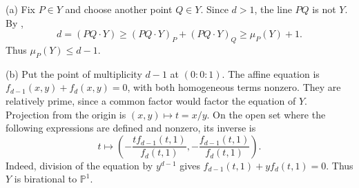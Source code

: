 (a) Fix $P\in Y$ and choose another point $Q\in Y$. Since $d>1$, the line $PQ$ is not $Y$. By ,
\[d=(PQ\cdot Y)\geq(PQ\cdot Y)_P+(PQ\cdot Y)_Q\geq\mu_P(Y)+1.\]
Thus $\mu_P(Y)\leq d-1$.

(b) Put the point of multiplicity $d-1$ at $(0:0:1)$. The affine equation is $f_{d-1}(x,y)+f_d(x,y)=0$, with both homogeneous terms nonzero. They are relatively prime, since a common factor would factor the equation of $Y$. Projection from the origin is $(x,y)\mapsto t=x/y$. On the open set where the following expressions are defined and nonzero, its inverse is
\[t\mapsto\left(-\frac{t f_{d-1}(t,1)}{f_d(t,1)},-\frac{f_{d-1}(t,1)}{f_d(t,1)}\right).\]
Indeed, division of the equation by $y^{d-1}$ gives $f_{d-1}(t,1)+y f_d(t,1)=0$. Thus $Y$ is birational to $\mathbb{P}^1$.

